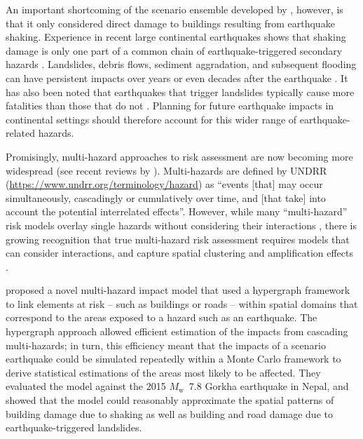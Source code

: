 \documentclass[nhess, manuscript]{copernicus}
\begin{document}
An important shortcoming of the scenario ensemble developed by \citet{Robinson2018}, however, is that it only considered direct damage to buildings resulting from earthquake shaking. Experience in recent large continental earthquakes shows that shaking damage is only one part of a common chain of earthquake-triggered secondary hazards \citep{Gill2014}. Landslides, debris flows, sediment aggradation, and subsequent flooding can have persistent impacts over years or even decades after the earthquake \citep{Fan2019,Kincey2021, francis_fate_2022}. It has also been noted that earthquakes that trigger landslides typically cause more fatalities than those that do not \citep{Budimir2014}. Planning for future earthquake impacts in continental settings should therefore account for this wider range of earthquake-related hazards.

Promisingly, multi-hazard approaches to risk assessment are now becoming more widespread (see recent reviews by \citealt{Gill2022,Ward2022}). Multi-hazards are defined by UNDRR (\url{https://www.undrr.org/terminology/hazard}) as ``events [that] may occur simultaneously, cascadingly or cumulatively over time, and [that take] into account the potential interrelated effects''. However, while many ``multi-hazard'' risk models overlay single hazards without considering their interactions \citep{Gill2014}, there is growing recognition that true multi-hazard risk assessment requires models that can consider interactions, and capture spatial clustering and  amplification effects \citep{Mignan2014,Tilloy2019,Dunant2021,Ming2022,Hochrainer-Stigler2023}.

\citet{Dunant2025} proposed a novel multi-hazard impact model that used a hypergraph framework to link elements at risk -- such as buildings or roads -- within spatial domains that correspond to the areas exposed to a hazard such as an earthquake. The hypergraph approach allowed efficient estimation of the impacts from cascading multi-hazards; in turn, this efficiency meant that the impacts of a scenario earthquake could be simulated repeatedly within a Monte Carlo framework to derive statistical estimations of the areas most likely to be affected. They evaluated the model against the 2015 $M_{\mathrm{w}}$~7.8 Gorkha earthquake in Nepal, and showed that the model could reasonably approximate the spatial patterns of building damage due to shaking as well as building and road damage due to earthquake-triggered landslides.
\end{document}
